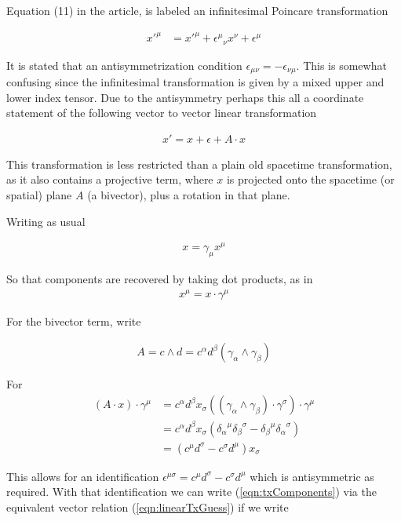 Equation (11) in the article, is labeled an infinitesimal Poincare transformation

\begin{align}\label{eqn:txComponents}
{x'}^\mu
&=
{x'}^\mu
+ {{\epsilon}^\mu}_\nu x^\nu
+ {\epsilon}^\mu
\end{align}

It is stated that an antisymmetrization condition $\epsilon_{\mu\nu} = -\epsilon_{\nu\mu}$.  This is somewhat confusing since the infinitesimal transformation is given by a mixed upper and lower index tensor.   Due to the antisymmetry perhaps this all a coordinate statement of the following vector to vector linear transformation 

\begin{align}\label{eqn:linearTxGuess}
x' = x + \epsilon + A \cdot x
\end{align}

This transformation is less restricted than a plain old spacetime transformation, as it also contains a projective term, where $x$ is projected onto the spacetime (or spatial) plane $A$ (a bivector), plus a rotation in that plane.

Writing as usual

\begin{align*}
x = \gamma_\mu x^\mu
\end{align*}

So that components are recovered by taking dot products, as in
\begin{align*}
x^\mu = x \cdot \gamma^\mu
\end{align*}

For the bivector term, write

\begin{align*}
A = c \wedge d = c^\alpha d^\beta (\gamma_\alpha \wedge \gamma_\beta)
\end{align*}

For
\begin{align*}
(A \cdot x ) \cdot \gamma^\mu 
&=
c^\alpha d^\beta x_\sigma ((\gamma_\alpha \wedge \gamma_\beta) \cdot \gamma^\sigma) \cdot \gamma^\mu \\
&=
c^\alpha d^\beta x_\sigma ( {\delta_\alpha}^\mu {\delta_\beta}^\sigma -{\delta_\beta}^\mu {\delta_\alpha}^\sigma ) \\
&=
(c^\mu d^\sigma -c^\sigma d^\mu ) x_\sigma 
\end{align*}

This allows for an identification $\epsilon^{\mu\sigma} = c^\mu d^\sigma -c^\sigma d^\mu$ which is antisymmetric as required.  With that identification we can write (\ref{eqn:txComponents}) via the equivalent vector relation (\ref{eqn:linearTxGuess}) if we write

